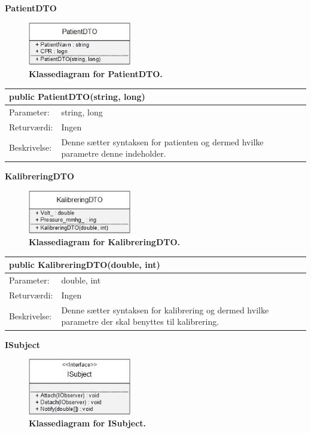 \textbf{PatientDTO}
\begin{figure}[H]
\includegraphics[width =0.4\textwidth , center]{billeder/klassediagrampatientDTO}
\caption{\textbf{Klassediagram for PatientDTO.}}
\end{figure}
\begin{table}[H]
\label{tab:tabel2}
\begin{tabular}{| l | p{13cm} |}
   \hline
   \multicolumn{2}{|l|}{public PatientDTO(string, long)} \\ \hline
   Parameter: & string, long\\ \hline
   Returværdi: & Ingen \\ \hline
   Beskrivelse: & Denne sætter syntaksen for patienten og dermed hvilke parametre denne indeholder.\\ \hline
\end{tabular}
\end{table}
\textbf{KalibreringDTO}
\begin{figure}[H]
\includegraphics[width =0.4\textwidth , center]{billeder/klassediagramkalibreringDTO}
\caption{\textbf{Klassediagram for KalibreringDTO.}}
\end{figure}
\begin{table}[H]
\label{tab:tabel2}
\begin{tabular}{| l | p{13cm} |}
   \hline
   \multicolumn{2}{|l|}{public KalibreringDTO(double, int)} \\ \hline
   Parameter: & double, int\\ \hline
   Returværdi: & Ingen \\ \hline
   Beskrivelse: & Denne sætter syntaksen for kalibrering og dermed hvilke parametre der skal benyttes til kalibrering.\\ \hline
\end{tabular}
\end{table}
\textbf{ISubject}
\begin{figure}[H]
\includegraphics[width =0.4\textwidth , center]{billeder/klassediagramIsubject}
\caption{\textbf{Klassediagram for ISubject.}}
\end{figure}
